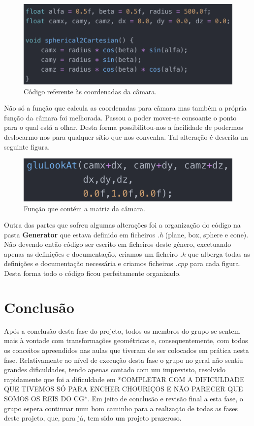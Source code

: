 \documentclass[a4paper]{article}
\begin{document}
\begin{figure}[H]
\centering
\includegraphics[scale=0.9]{camara.png}
\caption{Código referente às coordenadas da câmara.}
\label{img:camara}
\end{figure}

Não só a função que calcula as coordenadas para câmara mas também a própria função da câmara foi melhorada. Passou a poder mover-se consoante o ponto para o qual está a olhar. Desta forma possibilitou-nos a facilidade de podermos deslocarmo-nos para qualquer sítio que nos convenha. Tal alteração é descrita na seguinte figura.

\begin{figure}[H]
\centering
\includegraphics[scale=0.9]{mat_camara.png}
\caption{Função que contém a matriz da câmara.}
\label{img:mat_camara}
\end{figure}

Outra das partes que sofreu algumas alterações foi a organização do código na pasta \textbf{Generator} que estava definido em ficheiros \emph{.h} (plane, box, sphere e cone). Não devendo então código ser escrito em ficheiros deste género, excetuando apenas as definições e documentação, criamos um ficheiro \emph{.h} que alberga todas as definições e documentação necessária e criamos ficheiros \emph{.cpp} para cada figura. Desta forma todo o código ficou perfeitamente organizado.

\newpage

\section{Conclusão}
\label{sec:conclusao}

Após a conclusão desta fase do projeto, todos os membros do grupo se sentem mais à vontade com transformações geométricas e, consequentemente, com todos os conceitos apreendidos nas aulas que tiveram de ser colocados em prática nesta fase. Relativamente ao nível de execução desta fase o grupo no geral não sentiu grandes dificuldades, tendo apenas contado com um imprevisto, resolvido rapidamente que foi a dificuldade em *COMPLETAR COM A DIFICULDADE QUE TIVEMOS SÓ PARA ENCHER CHOURIÇOS E NÃO PARECER QUE SOMOS OS REIS DO CG*.
Em jeito de conclusão e revisão final a esta fase, o grupo espera continuar num bom caminho para a realização de todas as fases deste projeto, que, para já, tem sido um projeto prazeroso.
\end{document}
